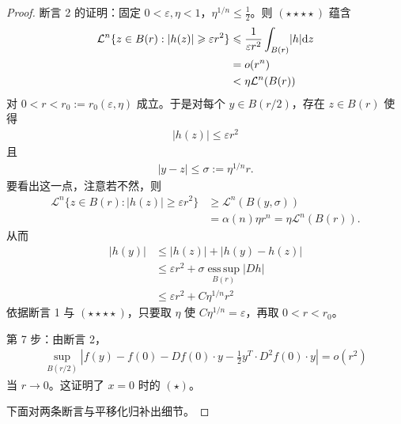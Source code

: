 \documentclass[../../main.tex]{subfiles}%
\begin{document}
\begin{proof}
断言 2 的证明：固定 $0<\varepsilon,\eta<1$，$\eta^{1/n}\leqslant\frac{1}{2}$。则 $(\star\star\star\star)$ 蕴含
\begin{align*}
\mathcal{L}^{n}\{z\in B(r):\lvert h(z)\rvert\geqslant\varepsilon r^{2}\}&\leqslant\frac{1}{\varepsilon r^{2}}\int_{B(r)}\lvert h\rvert\mathrm{d} z\\
&=o(r^{n})\\
&<\eta\mathcal{L}^{n}(B(r))
\end{align*}
对 $0<r<r_{0}:=r_{0}(\varepsilon,\eta)$ 成立。于是对每个 $y\in B(r/2)$，存在 $z\in B(r)$ 使得
\begin{align*}
\lvert h(z)\rvert\leqslant\varepsilon r^{2}
\end{align*}
且
\begin{align*}
\lvert y-z\rvert\leqslant\sigma:=\eta^{1/n}r.
\end{align*}
要看出这一点，注意若不然，则
\begin{align*}
\mathcal{L}^{n}\{z\in B(r):\lvert h(z)\rvert\geqslant\varepsilon r^{2}\}&\geqslant\mathcal{L}^{n}(B(y,\sigma))\\
&=\alpha(n)\eta r^{n}=\eta\mathcal{L}^{n}(B(r)).
\end{align*}
从而
\begin{align*}
\lvert h(y)\rvert&\leqslant\lvert h(z)\rvert+\lvert h(y)-h(z)\rvert\\
&\leqslant\varepsilon r^{2}+\sigma\operatorname*{ess\,sup}_{B(r)}\lvert Dh\rvert\\
&\leqslant\varepsilon r^{2}+C\eta^{1/n}r^{2}
\end{align*}
依据断言 1 与 $(\star\star\star\star)$，只要取 $\eta$ 使 $C\eta^{1/n}=\varepsilon$，再取 $0<r<r_{0}$。

第 7 步：由断言 2，
\begin{align*}
\sup_{B(r/2)}\left|f(y)-f(0)-Df(0)\cdot y-\frac{1}{2}y^{T}\cdot D^{2}f(0)\cdot y\right|=o(r^{2})
\end{align*}
当 $r\to0$。这证明了 $x=0$ 时的 $(\star)$。

下面对两条断言与平移化归补出细节。


\end{proof}
\end{document}

